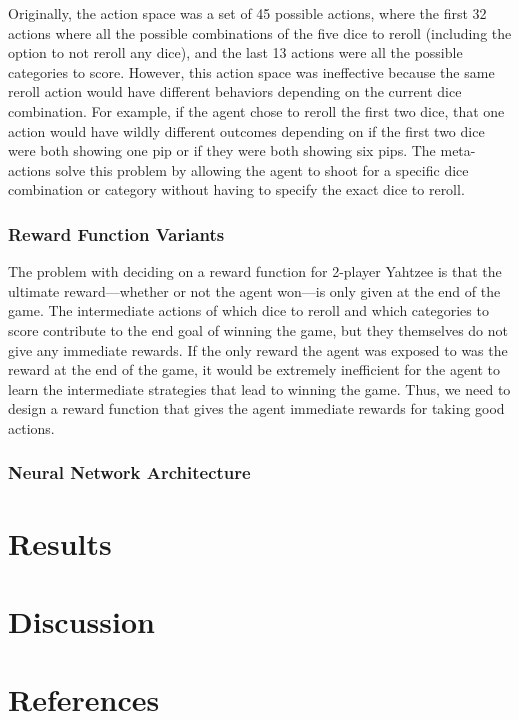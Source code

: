 \documentclass[12pt]{article}
\begin{document}
\noindent
Originally, the action space was a set of 45 possible actions, where the first 32 actions where all the possible combinations of the five dice to reroll (including the option to not reroll any dice), and the last 13 actions were all the possible categories to score. However, this action space was ineffective because the same reroll action would have different behaviors depending on the current dice combination. For example, if the agent chose to reroll the first two dice, that one action would have wildly different outcomes depending on if the first two dice were both showing one pip or if they were both showing six pips. The meta-actions solve this problem by allowing the agent to shoot for a specific dice combination or category without having to specify the exact dice to reroll.

\subsubsection{Reward Function Variants}
The problem with deciding on a reward function for 2-player Yahtzee is that the ultimate reward—whether or not the agent won—is only given at the end of the game. The intermediate actions of which dice to reroll and which categories to score contribute to the end goal of winning the game, but they themselves do not give any immediate rewards. If the only reward the agent was exposed to was the reward at the end of the game, it would be extremely inefficient for the agent to learn the intermediate strategies that lead to winning the game. Thus, we need to design a reward function that gives the agent immediate rewards for taking good actions.

\subsubsection{Neural Network Architecture}


\section{Results}

\section{Discussion}



\section{References}
\printbibliography[heading=none]
\end{document}
